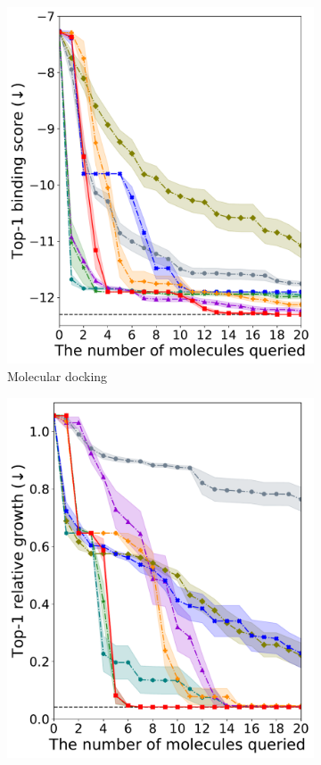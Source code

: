         \begin{figure}[ht]
        \begin{subfigure}{.24\textwidth}
            \centering
            \includegraphics[width=\textwidth]{BO-dockstring.pdf}
            \caption{Molecular docking}
            \label{fig:bo-docking}
        \end{subfigure}
        \hfill
        \begin{subfigure}{.24\textwidth}
            \centering
            \includegraphics[width=\textwidth]{BO-antibiotics.pdf}

\end{subfigure}
\end{figure}

